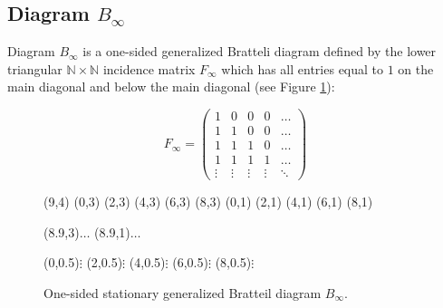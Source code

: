 \documentclass[11pt, twoside]{amsart}
\theoremstyle{definition}
\theoremstyle{remark}
\theoremstyle{plain}
\newcommand{\N}{\mathbb N}
\numberwithin{equation}{section}
\begin{document}
\subsection{Diagram $B_{\infty}$}\label{subsec:diagramB-infty}
Diagram $B_{\infty}$ is a one-sided generalized Bratteli diagram defined by the lower triangular $\N \times \N$ incidence matrix $F_{\infty}$ which has all entries equal to $1$ on the main diagonal and below the main diagonal (see Figure \ref{Fig:Binfty}):

$$
F_{\infty} = 
\begin{pmatrix}
    1 & 0 & 0 & 0 & \ldots\\
    1 & 1 & 0 & 0 & \ldots\\
    1 & 1 & 1 & 0 & \ldots\\
    1 & 1 & 1 & 1 & \ldots\\
    \vdots & \vdots & \vdots & \vdots & \ddots
    \end{pmatrix}
$$



\begin{figure}[hbt!]
\unitlength=1cm
\begin{graph}(9,4)
   (0,3)
 (2,3)
 (4,3)
 (6,3)
  (8,3)
 (0,1)
 (2,1)
 (4,1)
  (6,1)
    (8,1)
  



    

    
     
    
   
    
    
 \freetext(8.9,3){$\ldots$}
  \freetext(8.9,1){$\ldots$}
  
  \freetext(0,0.5){$\vdots$}
  \freetext(2,0.5){$\vdots$}
    \freetext(4,0.5){$\vdots$}
      \freetext(6,0.5){$\vdots$}  
        \freetext(8,0.5){$\vdots$} 


\end{graph}
\caption{One-sided stationary generalized Bratteil diagram $B_{\infty}$.}\label{Fig:Binfty}
\end{figure}
\end{document}
